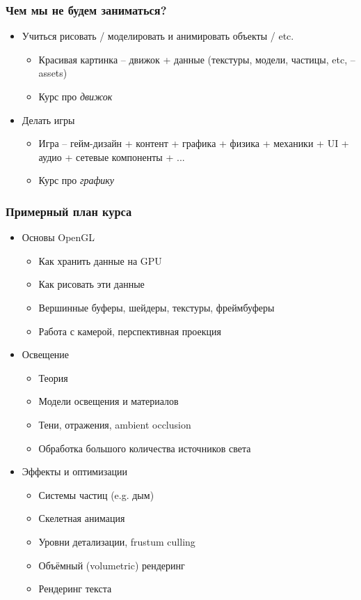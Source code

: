 \documentclass{beamer}
\begin{document}
\begin{frame}
\frametitle{Чем мы \textbf{не} будем заниматься?}
\begin{itemize}
\pause
\item Учиться рисовать / моделировать и анимировать объекты / etc.
\pause
\begin{itemize}
\item Красивая картинка -- движок + данные (текстуры, модели, частицы, etc, -- assets)
\item Курс про \textit{движок}
\end{itemize}
\pause
\item Делать игры
\begin{itemize}
\item Игра -- гейм-дизайн + контент + графика + физика + механики + UI + аудио + сетевые компоненты + ...
\item Курс про \textit{графику}
\end{itemize}
\end{itemize}
\end{frame}

\begin{frame}
\frametitle{Примерный план курса}
\pause
\begin{itemize}
\item Основы OpenGL
\begin{itemize}
\item Как хранить данные на GPU
\item Как рисовать эти данные
\item Вершинные буферы, шейдеры, текстуры, фреймбуферы
\item Работа с камерой, перспективная проекция
\end{itemize}
\pause
\item Освещение
\begin{itemize}
\item Теория
\item Модели освещения и материалов
\item Тени, отражения, ambient occlusion
\item Обработка большого количества источников света
\end{itemize}
\pause
\item Эффекты и оптимизации
\begin{itemize}
\item Системы частиц (e.g. дым)
\item Скелетная анимация
\item Уровни детализации, frustum culling
\item Объёмный (volumetric) рендеринг
\item Рендеринг текста
\end{itemize}
\end{itemize}
\end{frame}
\end{document}
